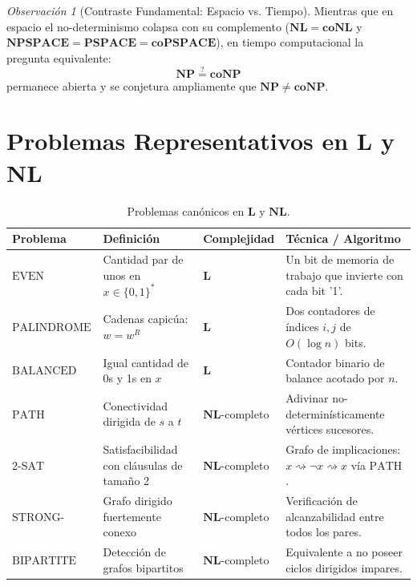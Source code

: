 \documentclass[11pt, a4paper]{article}
\theoremstyle{definition}
\theoremstyle{plain}
\theoremstyle{remark}
\newtheorem{observacion}[definicion]{Observación}
\newcommand{\classL}{\mathbf{L}}
\newcommand{\classNL}{\mathbf{NL}}
\newcommand{\classcoNL}{\mathbf{coNL}}
\newcommand{\classNP}{\mathbf{NP}}
\newcommand{\classcoNP}{\mathbf{coNP}}
\newcommand{\classPSPACE}{\mathbf{PSPACE}}
\newcommand{\classNPSPACE}{\mathbf{NPSPACE}}
\newcommand{\PATH}{\text{PATH}}
\begin{document}
\begin{observacion}[Contraste Fundamental: Espacio vs. Tiempo]
Mientras que en espacio el no-determinismo colapsa con su complemento ($\classNL = \classcoNL$ y $\classNPSPACE = \classPSPACE = \mathbf{coPSPACE}$), en tiempo computacional la pregunta equivalente:
\[
\classNP \stackrel{?}{=} \classcoNP
\]
permanece abierta y se conjetura ampliamente que $\classNP \ne \classcoNP$.
\end{observacion}

\section{Problemas Representativos en \texorpdfstring{$\classL$}{L} y \texorpdfstring{$\classNL$}{NL}}

\begin{table}[ht]
\centering
\small
\begin{tabularx}{\textwidth}{@{}l p{4.2cm} l X@{}}
\toprule
\textbf{Problema} & \textbf{Definición} & \textbf{Complejidad} & \textbf{Técnica / Algoritmo} \\ \midrule
$\text{EVEN}$ & Cantidad par de unos en $x \in {\{0,1\}}^*$ & $\classL$ & Un bit de memoria de trabajo que invierte con cada bit '1'. \\
$\text{PALINDROME}$ & Cadenas capicúa: $w = w^R$ & $\classL$ & Dos contadores de índices $i, j$ de $O(\log n)$ bits. \\
$\text{BALANCED}$ & Igual cantidad de 0s y 1s en $x$ & $\classL$ & Contador binario de balance acotado por $n$. \\
$\text{PATH}$ & Conectividad dirigida de $s$ a $t$ & $\classNL$-completo & Adivinar no-determinísticamente vértices sucesores. \\
$\text{2-SAT}$ & Satisfacibilidad con cláusulas de tamaño 2 & $\classNL$-completo & Grafo de implicaciones: $x \rightsquigarrow \neg x \rightsquigarrow x$ vía $\PATH$. \\
$\text{STRONG-CONN}$ & Grafo dirigido fuertemente conexo & $\classNL$-completo & Verificación de alcanzabilidad entre todos los pares. \\
$\text{BIPARTITE}$ & Detección de grafos bipartitos & $\classNL$-completo & Equivalente a no poseer ciclos dirigidos impares. \\ \bottomrule
\end{tabularx}
\caption{Problemas canónicos en $\classL$ y $\classNL$.}
\end{table}
\end{document}
